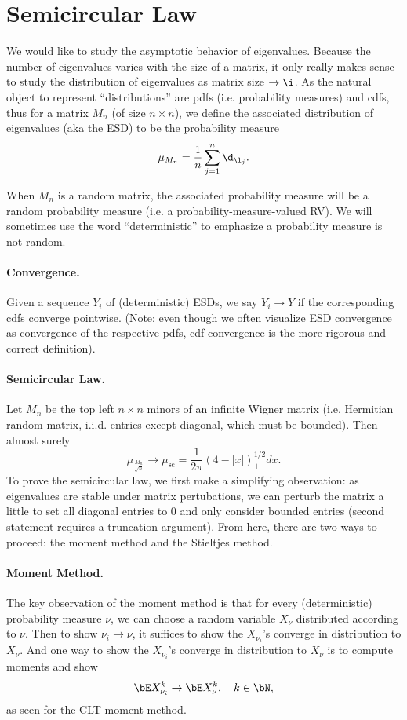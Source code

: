 \section*{Semicircular Law}

We would like to study the asymptotic behavior of eigenvalues. Because the number of eigenvalues varies with the size of a matrix, it only really makes sense to study the distribution of eigenvalues as matrix size $\to \i$. As the natural object to represent ``distributions'' are pdfs (i.e. probability measures) and cdfs, thus for a matrix $M_n$ (of size $n \times n$), we define the associated distribution of eigenvalues (aka the ESD) to be the probability measure
\[
    \mu_{M_n} = \frac{1}{n} \sum_{j = 1}^n \d_{\l_j}.
\]

When $M_n$ is a random matrix, the associated probability measure will be a random probability measure (i.e. a probability-measure-valued RV). We will sometimes use the word ``deterministic'' to emphasize a probability measure is not random.

\paragraph{Convergence.} Given a sequence $Y_i$ of (deterministic) ESDs, we say $Y_i \to Y$ if the corresponding cdfs converge pointwise. (Note: even though we often visualize ESD convergence as convergence of the respective pdfs, cdf convergence is the more rigorous and correct definition).

\paragraph{Semicircular Law.} Let $M_n$ be the top left $n \times n$ minors of an infinite Wigner matrix (i.e. Hermitian random matrix, i.i.d. entries except diagonal, which must be bounded). Then almost surely
\[
    \mu_{\frac{M_n}{\sqrt{n}}} \to \mu_{\text{sc}} = \frac{1}{2\pi}(4 - |x|)_+^{1/2}dx.
\]
To prove the semicircular law, we first make a simplifying observation: as eigenvalues are stable under matrix pertubations, we can perturb the matrix a little to set all diagonal entries to 0 and only consider bounded entries (second statement requires a truncation argument). From here, there are two ways to proceed: the moment method and the Stieltjes method.

\paragraph{Moment Method.} The key observation of the moment method is that for every (deterministic) probability measure $\nu$, we can choose a random variable $X_{\nu}$ distributed according to $\nu$. Then to show $\nu_i \to \nu$, it suffices to show the $X_{\nu_i}$'s converge in distribution to $X_{\nu}$. And one way to show the $X_{\nu_i}$'s converge in distribution to $X_{\nu}$ is to compute moments and show
\[
    \bE X_{\nu_i}^k \to \bE X_{\nu}^k, \quad k \in \bN,
\]
as seen for the CLT moment method.

